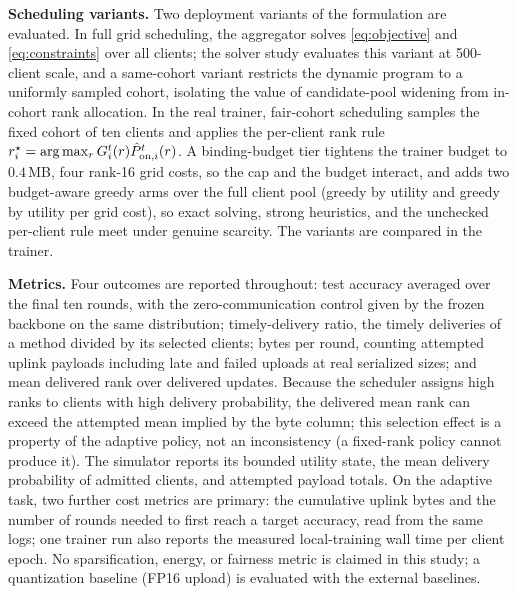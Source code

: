 \documentclass[a4paper,fleqn]{cas-dc}
\begin{document}
\par
\textbf{Scheduling variants.} Two deployment variants of the formulation are evaluated. In full grid scheduling, the aggregator solves \cref{eq:objective} and \cref{eq:constraints} over all clients; the solver study evaluates this variant at 500-client scale, and a same-cohort variant restricts the dynamic program to a uniformly sampled cohort, isolating the value of candidate-pool widening from in-cohort rank allocation. In the real trainer, fair-cohort scheduling samples the fixed cohort of ten clients and applies the per-client rank rule $r_i^\star=\arg\max_r G_i^t(r)\hat P_{{\rm on},i}^t(r)$. A binding-budget tier tightens the trainer budget to $0.4$\,MB, four rank-16 grid costs, so the cap and the budget interact, and adds two budget-aware greedy arms over the full client pool (greedy by utility and greedy by utility per grid cost), so exact solving, strong heuristics, and the unchecked per-client rule meet under genuine scarcity. The variants are compared in the trainer.
\par
\textbf{Metrics.} Four outcomes are reported throughout: test accuracy averaged over the final ten rounds, with the zero-communication control given by the frozen backbone on the same distribution; timely-delivery ratio, the timely deliveries of a method divided by its selected clients; bytes per round, counting attempted uplink payloads including late and failed uploads at real serialized sizes; and mean delivered rank over delivered updates. Because the scheduler assigns high ranks to clients with high delivery probability, the delivered mean rank can exceed the attempted mean implied by the byte column; this selection effect is a property of the adaptive policy, not an inconsistency (a fixed-rank policy cannot produce it). The simulator reports its bounded utility state, the mean delivery probability of admitted clients, and attempted payload totals. On the adaptive task, two further cost metrics are primary: the cumulative uplink bytes and the number of rounds needed to first reach a target accuracy, read from the same logs; one trainer run also reports the measured local-training wall time per client epoch. No sparsification, energy, or fairness metric is claimed in this study; a quantization baseline (FP16 upload) is evaluated with the external baselines.
\par
\end{document}

